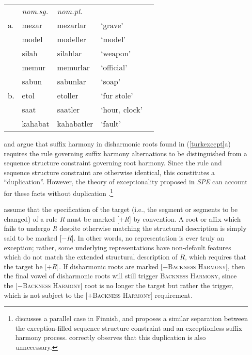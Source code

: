 \begin{example} 
\label{turkexcept}
\begin{tabular}{lllll}
   & \emph{nom.sg.} & \emph{nom.pl.}&                    \\
a. & {mezar}        & {mezarlar}    & `grave'       & \citep{TELL}       \\
   & {model}        & {modeller}    & `model'                            \\
   & {silah}        & {silahlar}    & `weapon'                           \\
   & {memur}        & {memurlar}    & `official'                         \\
   & {sabun}        & {sabunlar}    & `soap'                             \\
b. & {etol}         & {etoller}     & `fur stole'   & \citep{Goksel2005} \\
   & {saat}         & {saatler}     & `hour, clock' 	              \\
   & {kahabat}      & {kahabatler}  & `fault'       \\
\end{tabular}
\end{example}

\citet[212]{A74} and \citet{Iverson1978} argue that suffix harmony in disharmonic roots found in (\ref{turkexcept}a) requires the rule governing suffix harmony alternations to be distinguished from a sequence structure constraint governing root harmony. 
Since the rule and sequence structure constraint are otherwise identical, this constitutes a ``duplication''. 
However, the theory of exceptionality proposed in \emph{SPE} can account for these facts without duplication \citep[197f.]{Zonneveld1978}.\footnote{
    \citet[29f.]{Kiparsky1968} discusses a parallel case in Finnish, and proposes a similar separation between the exception-filled sequence structure constraint and an exceptionless suffix harmony process. 
    \citet[171f.]{Howard1972} correctly observes that this duplication is also unnecessary.}

\citeauthor{SPE} assume that the specification of the target (i.e., the segment or segments to be changed) of a rule \emph{R} must be marked [$+$\emph{R}] by convention. 
A root or affix which fails to undergo \emph{R} despite otherwise matching the structural description is simply said to be marked [$-$\emph{R}]. 
In other words, no representation is ever truly an exception; rather, some underlying representations have non-default features which do not match the extended structural description of $R$, which requires that the target be [$+R$]. 
If disharmonic roots are marked [$-$\textsc{Backness Harmony}], then the final vowel of disharmonic roots will still trigger \textsc{Backness Harmony}, since the [$-$\textsc{Backness Harmony}] root is no longer the target but rather the trigger, which is not subject to the [$+$\textsc{Backness Harmony}] requirement.

